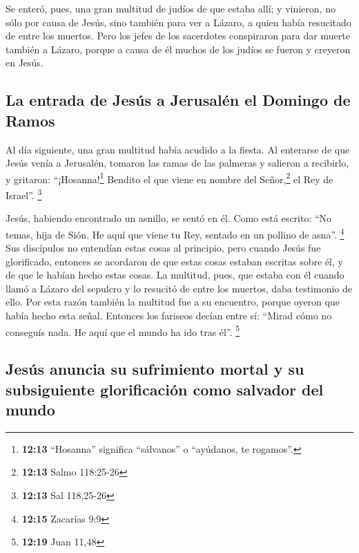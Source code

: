 \begin{paracol}{2}
 Se enteró, pues, una gran multitud de judíos de que
estaba allí; y vinieron, no sólo por causa de Jesús, sino también para
ver a Lázaro, a quien había resucitado de entre los muertos.
 Pero los jefes de los sacerdotes conspiraron para dar
muerte también a Lázaro,  porque a causa de él muchos de
los judíos se fueron y creyeron en Jesús.

\hypertarget{la-entrada-de-jesuxfas-a-jerusaluxe9n-el-domingo-de-ramos}{%
\subsection{La entrada de Jesús a Jerusalén el Domingo de
Ramos}\label{la-entrada-de-jesuxfas-a-jerusaluxe9n-el-domingo-de-ramos}}

 Al día siguiente, una gran multitud había acudido a la
fiesta. Al enterarse de que Jesús venía a Jerusalén, 
tomaron las ramas de las palmeras y salieron a recibirlo, y gritaron:
``¡Hosanna!\footnote{\textbf{12:13} ``Hosanna'' significa ``sálvanos'' o
  ``ayúdanos, te rogamos''.} Bendito el que viene en nombre del
Señor,\footnote{\textbf{12:13} Salmo 118:25-26} el Rey de Israel''.
\footnote{\textbf{12:13} Sal 118,25-26}

 Jesús, habiendo encontrado un asnillo, se sentó en él.
Como está escrito:  ``No temas, hija de Sión. He aquí que
viene tu Rey, sentado en un pollino de asna''. \footnote{\textbf{12:15}
  Zacarías 9:9}  Sus discípulos no entendían estas cosas
al principio, pero cuando Jesús fue glorificado, entonces se acordaron
de que estas cosas estaban escritas sobre él, y de que le habían hecho
estas cosas.  La multitud, pues, que estaba con él cuando
llamó a Lázaro del sepulcro y lo resucitó de entre los muertos, daba
testimonio de ello.  Por esta razón también la multitud
fue a su encuentro, porque oyeron que había hecho esta señal.
 Entonces los fariseos decían entre sí: ``Mirad cómo no
conseguís nada. He aquí que el mundo ha ido tras él''. \footnote{\textbf{12:19}
  Juan 11,48}

\hypertarget{jesuxfas-anuncia-su-sufrimiento-mortal-y-su-subsiguiente-glorificaciuxf3n-como-salvador-del-mundo}{%
\subsection{Jesús anuncia su sufrimiento mortal y su subsiguiente
glorificación como salvador del
mundo}\label{jesuxfas-anuncia-su-sufrimiento-mortal-y-su-subsiguiente-glorificaciuxf3n-como-salvador-del-mundo}}


\end{paracol}
